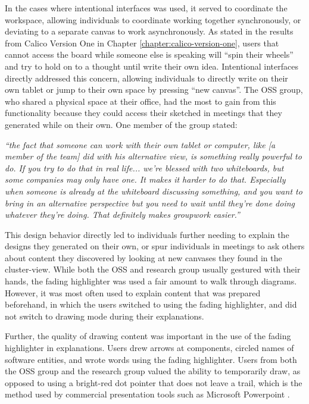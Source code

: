 \documentclass[12pt,fleqn]{ucithesis}
\begin{document}
In the cases where intentional interfaces was used, it served to coordinate the workspace, allowing individuals to coordinate working together synchronously, or deviating to a separate canvas to work asynchronously. As stated in the results from Calico Version One in Chapter \ref{chapter:calico-version-one}, users that cannot access the board while someone else is speaking will ``spin their wheels'' and try to hold on to a thought until write their own idea. Intentional interfaces directly addressed this concern, allowing individuals to directly write on their own tablet or jump to their own space by pressing ``new canvas''. The OSS group, who shared a physical space at their office, had the most to gain from this functionality because they could access their sketched in meetings that they generated while on their own. One member of the group stated:

\begin{myindentpar}{1cm}
\emph{``the fact that someone can work with their own tablet or computer, like [a member of the team] did with his alternative view, is something really powerful to do. If you try to do that in real life... we're blessed with two whiteboards, but some companies may only have one. It makes it harder to do that. Especially when someone is already at the whiteboard discussing something, and you want to bring in an alternative perspective but you need to wait until they're done doing whatever they're doing. That definitely makes groupwork easier.''}
\end{myindentpar}

This design behavior directly led to individuals further needing to explain the designs they generated on their own, or spur individuals in meetings to ask others about content they discovered by looking at new canvases they found in the cluster-view. While both the OSS and research group usually gestured with their hands, the fading highlighter was used a fair amount to walk through diagrams. However, it was most often used to explain content that was prepared beforehand, in which the users switched to using the fading highlighter, and did not switch to drawing mode during their explanations. 

Further, the quality of drawing content was important in the use of the fading highlighter in explanations. Users drew arrows at components, circled names of software entities, and wrote words using the fading highlighter. Users from both the OSS group and the research group valued the ability to temporarily draw, as opposed to using a bright-red dot pointer that does not leave a trail, which is the method used by commercial presentation tools such as Microsoft Powerpoint \cite{WinPowerPoint}.
\end{document}
